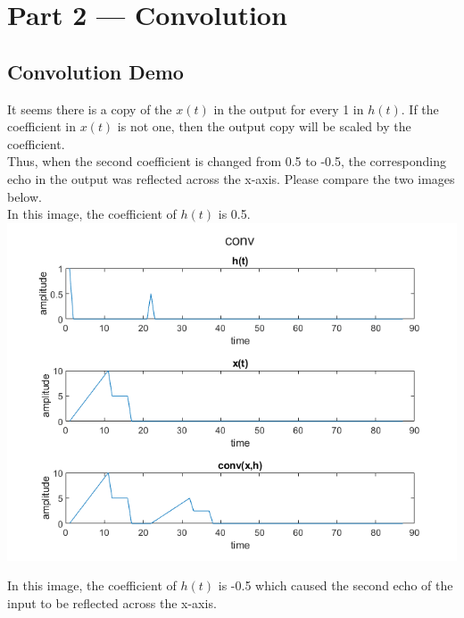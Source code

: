 \documentclass[11pt]{article}
\begin{document}
\pagebreak
\section{Part 2 --- Convolution}

\subsection{Convolution Demo}

It seems there is a copy of the $x(t)$ in the output for every 1 in $h(t)$.
If the coefficient in $x(t)$ is not one, then the output copy will be scaled by the coefficient.\\

Thus, when the second coefficient is changed from 0.5 to -0.5, the corresponding echo in the output was reflected across the x-axis.
Please compare the two images below.\\



In this image, the coefficient of $h(t)$ is 0.5.\\

\includegraphics[scale=0.7]{convolution.png}

In this image, the coefficient of $h(t)$ is -0.5 which caused the second echo of the input to be reflected across the x-axis.\\
\end{document}
